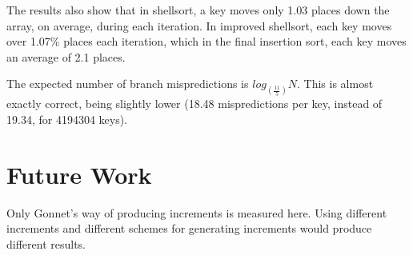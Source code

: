 The results also show that in shellsort, a key moves only 1.03 places down the
array, on average, during each iteration. In improved shellsort, each key moves
over 1.07\% places each iteration, which in the final insertion sort, each key
moves an average of 2.1 places.

The expected number of branch mispredictions is $log_{(\frac{11}{5})}N$.  This
is almost exactly correct, being slightly lower (18.48 mispredictions per key,
instead of 19.34, for 4194304 keys).


\section{Future Work}
Only Gonnet's way of producing increments is measured here. Using different
increments and different schemes for generating increments would produce
different results. 

